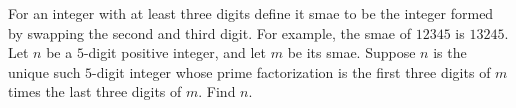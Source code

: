 For an integer with at least three digits define it smae to be the integer formed by swapping the second and third digit. For example, the smae of $12345$ is $13245$. Let $n$ be a $5$-digit positive integer, and let $m$ be its smae. Suppose $n$ is the unique such $5$-digit integer whose prime factorization is the first three digits of $m$ times the last three digits of $m$. Find $n$.
